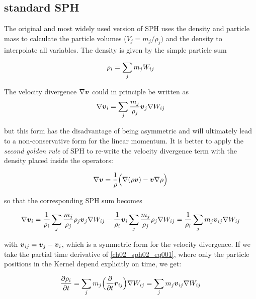 \subsection{standard SPH}
The original and most widely used version of SPH uses the density and particle mass to calculate the particle volumes ($V_j = m_j / \rho_j)$ and the density to interpolate all variables. The density is given by the simple particle sum

\begin{equation}
\label{ch02_sph02_eq001}
\rho_i = \sum_{j} m_j W_{ij}
\end{equation}

The velocity divergence $\nabla \boldsymbol{v}$ could in principle be written as
\begin{equation}
\label{ch02_sph02_eq002}
\nabla \boldsymbol{v}_i = \sum_{j} \frac{m_j}{\rho_j} \boldsymbol{v}_j \nabla W_{ij}
\end{equation}

but this form has the disadvantage of being asymmetric and will ultimately lead to a non-conservative form for the linear momentum. It is better to apply the \emph{second golden rule} of SPH \citep{Monaghan:1992p3721} to re-write the velocity divergence term with the density placed inside the operators:

\begin{equation}
\label{ch02_sph02_eq003}
\nabla \boldsymbol{v} = \frac{1}{\rho} \Big( \nabla (\rho \boldsymbol{v}) - \boldsymbol{v} \nabla \rho \Big)
\end{equation}

so that the corresponding SPH sum becomes 

\begin{equation}
\label{ch02_sph02_eq003}
\nabla \boldsymbol{v}_i = \frac{1}{\rho_i} \sum_{j} \frac{m_j}{\rho_j} \rho_j \boldsymbol{v}_j \nabla W_{ij} - \frac{1}{\rho_i} \boldsymbol{v}_i \sum_{j} \frac{m_j}{\rho_j} \rho_j \nabla W_{ij} = \frac{1}{\rho_i} \sum_{j} m_j \boldsymbol{v}_{ij} \nabla W_{ij} 
\end{equation}

with $\boldsymbol{v}_{ij} = \boldsymbol{v}_j - \boldsymbol{v}_i$, which is a symmetric form for the velocity divergence. If we take the partial time derivative of \ref{ch02_sph02_eq001}, where only the particle positions in the Kernel depend explicitly on time, we get: 

\begin{equation}
\label{ch02_sph02_eq004}
\frac{\partial \rho_i}{\partial t}  = \sum_{j} m_j \Big( \frac{\partial}{\partial t} \boldsymbol{r}_{ij} \Big) \nabla W_{ij} = \sum_{j} m_j \boldsymbol{v}_{ij} \nabla W_{ij} 
\end{equation}

